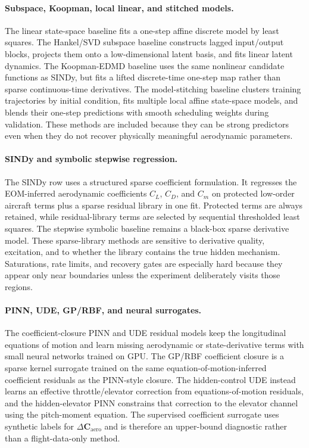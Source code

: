\documentclass[11pt]{article}
\begin{document}
\paragraph{Subspace, Koopman, local linear, and stitched models.}
The linear state-space baseline fits a one-step affine discrete model by least
squares. The Hankel/SVD subspace baseline constructs lagged input/output blocks,
projects them onto a low-dimensional latent basis, and fits linear latent
dynamics. The Koopman-EDMD baseline uses the same nonlinear candidate functions
as SINDy, but fits a lifted discrete-time one-step map rather than sparse
continuous-time derivatives. The model-stitching baseline clusters training
trajectories by initial condition, fits multiple local affine state-space
models, and blends their one-step predictions with smooth scheduling weights
during validation. These methods are included because they can be
strong predictors even when they do not recover physically meaningful
aerodynamic parameters.

\paragraph{SINDy and symbolic stepwise regression.}
The SINDy row uses a structured sparse coefficient formulation. It regresses the
EOM-inferred aerodynamic coefficients $C_L$, $C_D$, and $C_m$ on protected
low-order aircraft terms plus a sparse residual library in one fit. Protected
terms are always retained, while residual-library terms are selected by
sequential thresholded least squares. The stepwise symbolic baseline remains a
black-box sparse derivative model. These sparse-library methods are sensitive
to derivative quality, excitation, and to whether the library contains the true
hidden mechanism. Saturations, rate limits, and recovery gates are especially
hard because they appear only near
boundaries unless the experiment deliberately visits those regions.

\paragraph{PINN, UDE, GP/RBF, and neural surrogates.}
The coefficient-closure PINN and UDE residual models keep the longitudinal
equations of motion and learn missing aerodynamic or state-derivative terms with
small neural networks trained on GPU. The GP/RBF coefficient closure is a
sparse kernel surrogate trained on the same equation-of-motion-inferred
coefficient residuals as the PINN-style closure. The hidden-control UDE instead learns an
effective throttle/elevator correction from equations-of-motion residuals, and
the hidden-elevator PINN constrains that correction to the elevator channel using
the pitch-moment equation. The supervised coefficient surrogate uses synthetic
labels for $\Delta\mathbf{C}_{\mathrm{aero}}$ and is therefore an upper-bound
diagnostic rather than a flight-data-only method.
\end{document}

